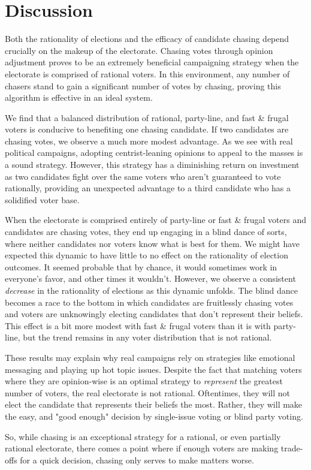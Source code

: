 \section{Discussion}
\label{sec:discussion}


Both the rationality of elections and the efficacy of candidate chasing depend
crucially on the makeup of the electorate. 
Chasing votes through opinion adjustment proves to be an extremely beneficial
campaigning strategy when the electorate is comprised of rational voters. In
this environment, any number of chasers stand to gain a significant number of
votes by chasing, proving this algorithm is effective in an ideal system.

We find that a balanced distribution
of rational, party-line, and fast \& frugal voters is conducive to benefiting
one chasing candidate. If two candidates are chasing votes, we observe a much
more modest advantage. As we see with real political campaigns, adopting
centrist-leaning opinions to appeal to the masses is a sound strategy. However, 
this strategy has a diminishing return on investment as two candidates fight over
the same voters who aren't guaranteed to vote rationally, providing an unexpected advantage to
a third candidate who has a solidified voter base.

When the electorate is comprised entirely of party-line or fast \& frugal voters and
candidates are chasing votes, they end up engaging in a blind dance of sorts, where
neither candidates nor voters know what is best for them. We might have
expected this dynamic to have little to no effect on the rationality
of election outcomes. It seemed probable that by chance, it would sometimes
work in everyone's favor, and other times it wouldn't. However, we observe
a consistent \textit{decrease} in the rationality of elections as this dynamic
unfolds. The blind dance becomes a race to the bottom in which candidates
are fruitlessly chasing votes and voters are unknowingly electing candidates
that don't represent their beliefs. This effect is a bit more modest with
fast \& frugal voters than it is with party-line, but the trend remains
in any voter distribution that is not rational.

These results may explain why real campaigns rely on strategies like emotional
messaging and playing up hot topic issues. Despite the fact that matching
voters where they are opinion-wise is an optimal strategy to \textit{represent} 
the greatest number of voters, the real electorate is not rational. Oftentimes, they
will not elect the candidate that represents their beliefs the most. Rather,
they will make the easy, and "good enough" decision by single-issue voting or
blind party voting.

So, while chasing is an exceptional strategy for a rational, or even partially
rational electorate, there comes a point where if enough voters are making
trade-offs for a quick decision, chasing only serves to make matters worse. 